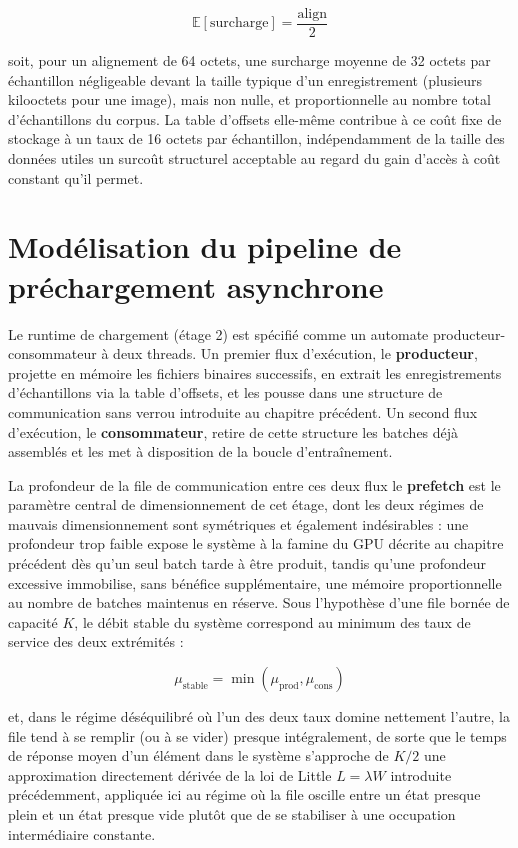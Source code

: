 \documentclass[12pt,a4paper]{report}
\begin{document}
\begin{equation}
\label{eq:surcharge_alignement}
\mathbb{E}[\text{surcharge}] = \frac{\text{align}}{2}
\end{equation}

soit, pour un alignement de 64 octets, une surcharge moyenne de 32 octets par échantillon négligeable devant la taille typique d'un enregistrement (plusieurs kilooctets pour une image), mais non nulle, et proportionnelle au nombre total d'échantillons du corpus. La table d'offsets elle-même contribue à ce coût fixe de stockage à un taux de 16 octets par échantillon, indépendamment de la taille des données utiles un surcoût structurel acceptable au regard du gain d'accès à coût constant qu'il permet.

\section{Modélisation du pipeline de préchargement asynchrone}
\label{sec:prefetch}

Le runtime de chargement (étage 2) est spécifié comme un automate producteur-consommateur à deux threads. Un premier flux d'exécution, le \textbf{producteur}, projette en mémoire les fichiers binaires successifs, en extrait les enregistrements d'échantillons via la table d'offsets, et les pousse dans une structure de communication sans verrou introduite au chapitre précédent. Un second flux d'exécution, le \textbf{consommateur}, retire de cette structure les batches déjà assemblés et les met à disposition de la boucle d'entraînement.

La profondeur de la file de communication entre ces deux flux le \textbf{prefetch} est le paramètre central de dimensionnement de cet étage, dont les deux régimes de mauvais dimensionnement sont symétriques et également indésirables : une profondeur trop faible expose le système à la famine du GPU décrite au chapitre précédent dès qu'un seul batch tarde à être produit, tandis qu'une profondeur excessive immobilise, sans bénéfice supplémentaire, une mémoire proportionnelle au nombre de batches maintenus en réserve. Sous l'hypothèse d'une file bornée de capacité $K$, le débit stable du système correspond au minimum des taux de service des deux extrémités :

\begin{equation}
\label{eq:debit_stable}
\mu_{\text{stable}} = \min(\mu_{\text{prod}}, \mu_{\text{cons}})
\end{equation}

et, dans le régime déséquilibré où l'un des deux taux domine nettement l'autre, la file tend à se remplir (ou à se vider) presque intégralement, de sorte que le temps de réponse moyen d'un élément dans le système s'approche de $K/2$ une approximation directement dérivée de la loi de Little $L = \lambda W$ introduite précédemment, appliquée ici au régime où la file oscille entre un état presque plein et un état presque vide plutôt que de se stabiliser à une occupation intermédiaire constante.
\end{document}
